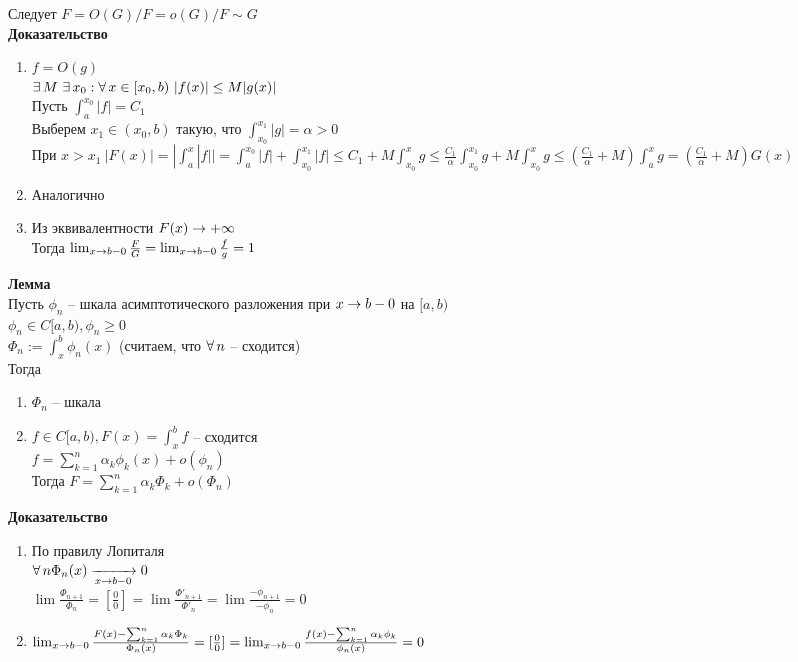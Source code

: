 \documentclass[12pt]{article}
\begin{document}
Следует $F=O(G) / F=o(G) / F \sim G$\\
\textbf{Доказательство}
\begin{enumerate}
    \item $f = O(g)$\\
    $\exists\, M\ \exists\, x_0: \forall\, x\in[x_0, b)\ |f(x)| \leq M|g(x)|$\\
    Пусть $\int_a^{x_0} |f| = C_1$\\
    Выберем $x_1 \in (x_0, b)$ такую, что $\int_{x_0}^{x_1} |g| = \alpha > 0$\\
    При $x > x_1 \ |F(x)| = | \int_a^x|f| | = \int_a^{x_0} |f| + \int_{x_0}^{x_1} |f| \leq C_1 + M\int_{x_0}^x g \leq \frac{C_1}\alpha \int_{x_0}^{x_1} g + M\int_{x_0}^xg \leq (\frac{C_1}\alpha + M)\int_a^x g = (\frac{C_1}\alpha + M) G(x)$
    \item Аналогично
    \item Из эквивалентности $F(x) \rightarrow +\infty$\\
    Тогда $\lim_{x\rightarrow b-0} \frac FG=\lim_{x\rightarrow b-0} \frac fg = 1$
\end{enumerate}
\textbf{Лемма}\\
Пусть $\phi_n$ -- шкала асимптотического разложения при $x\rightarrow b-0$ на $[a,b)$\\
$\phi_n \in C[a,b), \phi_n \geq 0$\\
$\Phi_n:=\int_x^b \phi_n(x)$ (считаем, что $\forall\, n$ -- сходится)\\
Тогда
\begin{enumerate}
    \item $\Phi_n$ -- шкала
    \item $f\in C[a,b), F(x) = \int_x^b f$ -- сходится\\
    $f = \sum_{k=1}^n \alpha_k \phi_k(x)+o(\phi_n)$\\
    Тогда $F = \sum_{k=1}^n \alpha_k \Phi_k + o(\Phi_n)$
\end{enumerate}
\textbf{Доказательство}
\begin{enumerate}
    \item По правилу Лопиталя\\
    $\forall\, n \Phi_n(x) \xrightarrow[x\rightarrow b-0]{} 0$\\
    $\lim \frac{\Phi_{n+1}}{\Phi_n} = [\frac00] = \lim \frac{\Phi'_{n+1}}{\Phi'_n} = \lim \frac{-\phi_{n+1}}{-\phi_n} = 0$
    \item $\lim_{x\rightarrow b-0} \frac{F(x) - \sum_{k=1}^n \alpha_k \Phi_k}{\Phi_n(x)} = [\frac00] = \lim_{x\rightarrow b-0} \frac{f(x) - \sum_{k=1}^n \alpha_k \phi_k}{\phi_n(x)} = 0$
\end{enumerate}
\end{document}
